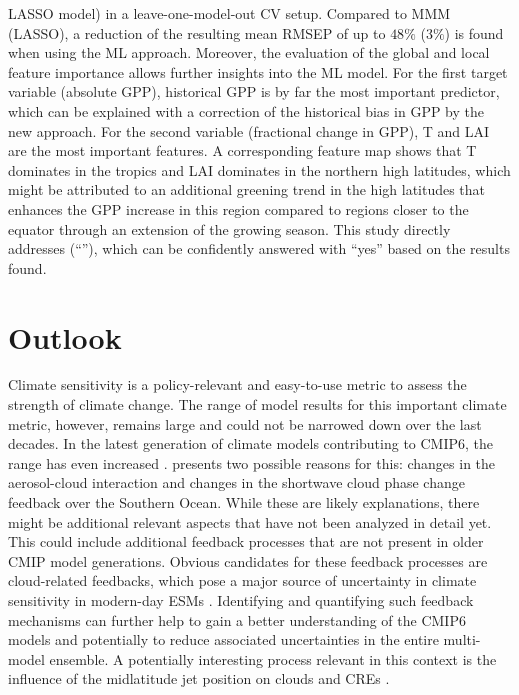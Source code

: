 \ac{LASSO} model) in a leave-one-model-out \ac{CV} setup. Compared to \ac{MMM}
(\ac{LASSO}), a reduction of the resulting mean \ac{RMSEP} of up to $48
\unit{\%}$ ($3 \unit{\%}$) is found when using the \ac{ML} approach. Moreover,
the evaluation of the global and local feature importance allows further
insights into the \ac{ML} model. For the first target variable (absolute
\ac{GPP}), historical \ac{GPP} is by far the most important predictor, which
can be explained with a correction of the historical bias in \ac{GPP} by the
new approach. For the second variable (fractional change in \ac{GPP}), \ac{T}
and \ac{LAI} are the most important features. A corresponding feature map shows
that \ac{T} dominates in the tropics and \ac{LAI} dominates in the northern
high latitudes, which might be attributed to an additional greening trend in
the high latitudes that enhances the \ac{GPP} increase in this region compared
to regions closer to the equator through an extension of the growing season.
This study directly addresses 
(\enquote{\KeyScienceQuestionThree{}}), which can be confidently answered with
\enquote{yes} based on the results found.


\section{Outlook}
\label{sec:07:outlook}

Climate sensitivity is a policy-relevant and easy-to-use metric to assess the
strength of climate change. The range of model results for this important
climate metric, however, remains large and could not be narrowed down over the
last decades. In the latest generation of climate models contributing to
\acs{CMIP}6, the range has even increased \autocite{Meehl2020}.
 presents two possible reasons for this:
changes in the aerosol-cloud interaction and changes in the shortwave cloud
phase change feedback over the Southern Ocean. While these are likely
explanations, there might be additional relevant aspects that have not been
analyzed in detail yet. This could include additional feedback processes that
are not present in older \ac{CMIP} model generations. Obvious candidates for
these feedback processes are cloud-related feedbacks, which pose a major source
of uncertainty in climate sensitivity in modern-day \acp{ESM}
\autocite{Boucher2013}. Identifying and quantifying such feedback mechanisms
can further help to gain a better understanding of the \acs{CMIP}6 models and
potentially to reduce associated uncertainties in the entire multi-model
ensemble. A potentially interesting process relevant in this context is the
influence of the midlatitude jet position on clouds and \acp{CRE}
\autocite{Grise2016}.


